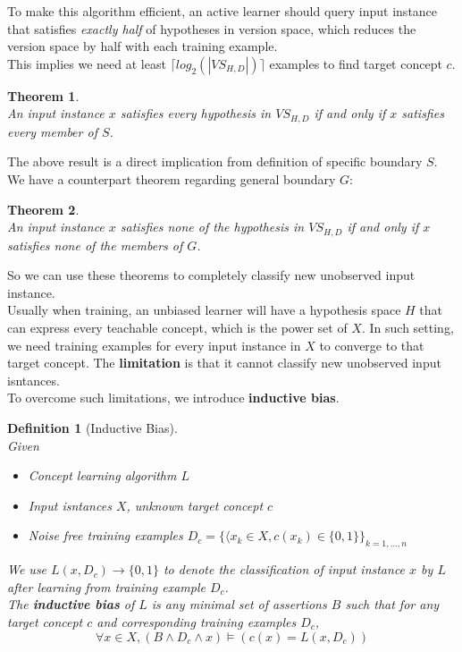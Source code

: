 \documentclass[12pt]{article}
\newtheorem{definition}{Definition}[section]
\newtheorem{theorem}{Theorem}[section]
\theoremstyle{definition}
\begin{document}
To make this algorithm efficient, an active learner should query input instance that satisfies \textit{exactly half} of hypotheses in version space, which reduces the version space by half with each training example.\\
This implies we need at least $\lceil log_2(|VS_{H,D}|)\rceil$ examples to find target concept $c$.
\begin{theorem}\hfill\\\normalfont An input instance $x$ satisfies every hypothesis in $VS_{H,D}$ if and only if $x$ satisfies every member of $S$.
\end{theorem}
The above result is a direct implication from definition of specific boundary $S$.\\
We have a counterpart theorem regarding general boundary $G$:
\begin{theorem}\hfill\\\normalfont An input instance $x$ satisfies none of the hypothesis in $VS_{H,D}$ if and only if $x$ satisfies none of the members of $G$.
\end{theorem}
So we can use these theorems to completely classify new unobserved input instance.\\
Usually when training, an unbiased learner will have a hypothesis space $H$ that can express every teachable concept, which is the power set of $X$. In such setting, we need training examples for every input instance in $X$ to converge to that target concept. The \textbf{limitation} is that it cannot classify new unobserved input isntances.\\
To overcome such limitations, we introduce \textbf{inductive bias}.
\begin{definition}[Inductive Bias]
\hfill\\\normalfont
Given
\begin{itemize}
\item Concept learning algorithm $L$
\item Input isntances $X$, unknown target concept $c$
\item Noise free training examples $D_c=\{\langle x_k\in X, c(x_k)\in \{0,1\}\}_{k=1,\ldots, n}$
\end{itemize}
We use $L(x, D_c)\to \{0,1\}$ to denote the classification of input instance $x$ by $L$ after learning from training example $D_c$.\\
The \textbf{inductive bias} of $L$ is any minimal set of assertions $B$ such that for any target concept $c$ and corresponding training examples $D_c$,
\[
\forall x\in X, (B\land D_c\land x)\models (c(x)=L(x,D_c))
\]
\end{definition}
\end{document}

